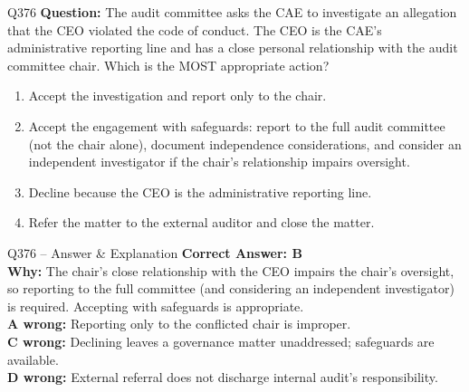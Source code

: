 \documentclass[aspectratio=169,10pt]{beamer}
\begin{document}
	\begin{frame}[t]{Q376}
		\small
		\textbf{Question:} The audit committee asks the CAE to investigate an allegation that the CEO violated the code of conduct. The CEO is the CAE's administrative reporting line and has a close personal relationship with the audit committee chair. Which is the MOST appropriate action?
		\begin{enumerate}[label=\Alph*.,itemsep=1pt,topsep=2pt]
			\item Accept the investigation and report only to the chair.
			\item Accept the engagement with safeguards: report to the full audit committee (not the chair alone), document independence considerations, and consider an independent investigator if the chair's relationship impairs oversight.
			\item Decline because the CEO is the administrative reporting line.
			\item Refer the matter to the external auditor and close the matter.
		\end{enumerate}
	\end{frame}
	
	\begin{frame}[t]{Q376 -- Answer \& Explanation}
		\small
		\textbf{Correct Answer: B} \\[4pt]
		\textbf{Why:} The chair's close relationship with the CEO impairs the chair's oversight, so reporting to the full committee (and considering an independent investigator) is required. Accepting with safeguards is appropriate. \\[4pt]
		\textbf{A wrong:} Reporting only to the conflicted chair is improper. \\[2pt]
		\textbf{C wrong:} Declining leaves a governance matter unaddressed; safeguards are available. \\[2pt]
		\textbf{D wrong:} External referral does not discharge internal audit's responsibility.
	\end{frame}
	
\end{document}
